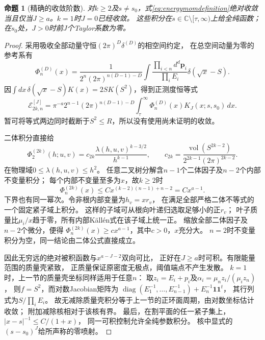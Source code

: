 \documentclass[11pt,a4paper]{ctexart}
\theoremstyle{cnplain}\newtheorem{theorem}{定理}[section]
\newtheorem{proposition}[theorem]{命题}
\theoremstyle{definition}\newtheorem{definition}[theorem]{定义}
\theoremstyle{remark}\newtheorem{remark}[theorem]{注}
\begin{document}
\begin{proposition}[精确的收敛阶数]\label{prop:energymomconvergence}
对$k\geq2$及$s\ne s_0$，式\eqref{eq:energymomdefinition}绝对收敛
当且仅当$J\geq a$。$k=1$时$J=0$已经收敛。
这些积分在$s\in\mathbb C\setminus[\tau,\infty)$上给全纯函数；
在$s_0$处，$J>0$时前$J$个Taylor系数为零。
\end{proposition}
\begin{proof}
采用吸收全部动量守恒$(2\pi)^D\delta^{(D)}$的相空间约定，
在总空间动量为零的参考系有
\[
 \Phi_n^{(D)}(x)=
 \frac{1}{2^n(2\pi)^{n(D-1)-D}}
 \int\frac{\prod_{i<n}d^d\boldsymbol p_i}{\prod_i E_i}
                \delta(\sqrt x-S).
\]
因$\int dx\,\delta(\sqrt x-S)K(x)=2SK(S^2)$，得到正测度恒等式
\begin{equation}\label{eq:energyphasespectral}
 \mathcal E_{2k,n}^{[J]}
 =\pi^{-a}2^{n-1}(2\pi)^{n(D-1)-D}
       \int_\tau^\infty\Phi_n^{(D)}(x)K_J(x;s,s_0)\,dx.
\end{equation}
暂可将等式两边同时截断于$S^2\leq R$，所以没有使用尚未证明的收敛。

二体积分直接给
\[
 \Phi_2^{(2k)}(h;u,v)
   =c_{2k}\frac{\lambda(h,u,v)^{k-3/2}}{h^{k-1}},\qquad
 c_{2k}=\frac{\operatorname{vol}(S^{2k-2})}
                   {2^{2k-1}(2\pi)^{2k-2}}.
\]
在物理域$0\leq\lambda(h,u,v)\leq h^2$。
任意二叉树分解含$n-1$个二体因子及$n-2$个内部不变量积分；
每个内部不变量至多为$x$，故$k\geq2$时
\[
                 \Phi_n^{(2k)}(x)\leq Cx^{(k-2)(n-1)+n-2}
                                      =Cx^{a-1}.
\]
下界也有同一幂次。令非根内部变量为$h_v=xr_v$，
在满足全部严格二体不等式的一个固定紧子域上积分。
这样的子域可从根向叶递归选取足够小的正$r_v$；
叶子质量比$\mu_i/x$趋于零，所有内部Källén式在该子域上统一正。
缩放全部二体因子及$n-2$个微分，便得
$\Phi_n^{(2k)}(x)\geq c x^{a-1}$，其中$c>0$，$x$充分大。
$n=2$时不变量积分为空，同一结论由二体公式直接成立。

因此无穷远的绝对被积函数与$x^{a-J-2}$双向可比，
正好在$J\geq a$时可积。有限能量范围的质量壳紧致，
正质量保证原密度无极点，阈值端点不产生发散。
$k=1$时，上一节的质量壳坐标同样适用于任意$n$：
取$z_i=E_i+p_i$及$\alpha_i=\mu_n z_i/(\mu_i z_n)$，
则$f=S^2$，而对数Jacobian矩阵为
$\operatorname{diag}(E_1^{-1},\ldots,E_{n-1}^{-1})+E_n^{-1}\mathbf1\mathbf1^t$，
其行列式为$S/\prod_iE_i$。
故无减除质量壳积分等于上一节的正环面周期，由对数坐标估计收敛；
附加减除核相对于该核有界。
最后，在割平面的任一紧子集上，$|x-s|^{-1}\leq C/(1+x)$，
同一可积控制允许全纯参数积分。
核中显式的$(s-s_0)^J$给所声称的零喷射。
\end{proof}
\end{document}
